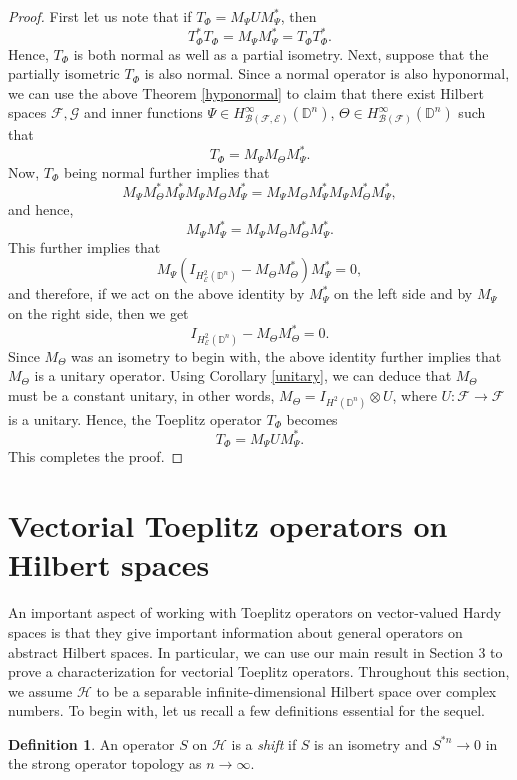 \documentclass[12pt]{amsart}
\theoremstyle{definition}
\newtheorem{defn}[propn]{Definition}
\newcommand{\D}{\mathbb{D}}
\newcommand{\1}{{\mbox{\bf 1}}}
\newcommand{\clb}{\mathcal{B}}
\newcommand{\cle}{\mathcal{E}}
\newcommand{\clf}{\mathcal{F}}
\newcommand{\clg}{\mathcal{G}}
\newcommand{\clh}{\mathcal{H}}
\newcommand{\raro}{\rightarrow}
\begin{document}
\begin{proof}
First let us note that if $T_{\Phi} = M_{\Psi} U M_{\Psi}^*$, then
\[
T_{\Phi}^* T_{\Phi}  = M_{\Psi} M_{\Psi}^* = T_{\Phi} T_{\Phi}^*. 
\]
Hence, $T_{\Phi}$ is both normal as well as a partial isometry.  Next, suppose that the partially isometric $T_{\Phi}$ is also normal. Since a normal operator is also hyponormal, we can use the above Theorem \ref{hyponormal} to claim that there exist Hilbert spaces $\clf, \clg$ and inner functions $\Psi \in H_{\clb(\clf,\cle)}^{\infty}(\D^n)$, $ \Theta \in H_{\clb(\clf)}^{\infty}(\D^n)$ such that
\[
T_{\Phi} = M_{\Psi} M_{\Theta} M_{\Psi}^*.
\]
Now, $T_{\Phi}$ being normal further implies that
\[
M_{\Psi} M_{\Theta}^* M_{\Psi}^* M_{\Psi} M_{\Theta} M_{\Psi}^* = M_{\Psi} M_{\Theta} M_{\Psi}^*M_{\Psi} M_{\Theta}^* M_{\Psi}^*,
\]
and hence,
\[
M_{\Psi}  M_{\Psi}^* = M_{\Psi} M_{\Theta} M_{\Theta}^* M_{\Psi}^*.
\]
This further implies that
\[
M_{\Psi} (I_{H_{\cle}^2(\D^n)} - M_{\Theta} M_{\Theta}^*) M_{\Psi}^* = 0,
\]
and therefore, if we act on the above identity by $M_{\Psi}^*$ on the left side and by $M_{\Psi}$ on the right side, then we get
\[
I_{H_{\cle}^2(\D^n)} - M_{\Theta} M_{\Theta}^* = 0.
\]
Since $M_{\Theta}$ was an isometry to begin with, the above identity further implies that $M_{\Theta}$ is a unitary operator. Using Corollary \ref{unitary}, we can deduce that $M_{\Theta}$ must be a constant unitary, in other words, $M_{\Theta} = I_{H^2(\D^n)} \otimes U$, where $U: \clf \raro \clf$ is a unitary. Hence, the Toeplitz operator $T_{\Phi}$ becomes
\[
T_{\Phi} = M_{\Psi} U M_{\Psi}^*.
\]
This completes the proof.
\end{proof}
\section{Vectorial Toeplitz operators on  Hilbert spaces}\label{abstract}
An important aspect of working with Toeplitz operators on vector-valued Hardy spaces is that they give important information about general operators on abstract Hilbert spaces. In particular, we can use our main result in Section 3 to prove a characterization for vectorial Toeplitz operators. Throughout this section, we assume $\clh$ to be a separable infinite-dimensional Hilbert space over complex numbers. To begin with, let us recall a few definitions essential for the sequel.

\begin{defn}
An operator $S$ on $\clh$ is a \textit{shift} if $S$ is an isometry and $S^{*n} \raro 0$ in the strong operator topology as $n \raro \infty$.
\end{defn}
\end{document}
